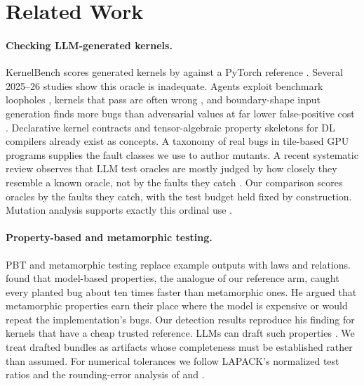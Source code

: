 \section{Related Work}
\label{sec:related}

\paragraph{Checking LLM-generated kernels.}
KernelBench scores generated kernels by \allclose against a PyTorch reference
\citep{ouyang2025kernelbench}. Several 2025--26 studies show this oracle is inadequate.
Agents exploit benchmark loopholes \citep{lange2025robust}, kernels that pass are often
wrong \citep{sarkar2026illusion}, and boundary-shape input generation finds more bugs
than adversarial values at far lower false-positive cost \citep{sarkar2026inputs}.
Declarative kernel contracts \citep{veit2026contracts,shah2026contract} and
tensor-algebraic property skeletons for DL compilers \citep{qiu2026propilot} already
exist as concepts. A taxonomy of \isstaBugs{} real bugs in tile-based GPU programs
\citep{rathnasuriya2026tile} supplies the fault classes we use to author mutants. A
recent systematic review observes that LLM test oracles are mostly judged by how closely
they resemble a known oracle, not by the faults they catch \citep{mughal2026oracles}. Our
comparison scores oracles by the faults they catch, with the test budget held fixed by
construction. Mutation analysis supports exactly this ordinal use
\citep{andrews2005mutation,just2014mutants,papadakis2018mutation}.

\paragraph{Property-based and metamorphic testing.}
PBT \citep{claessen2000quickcheck,maciver2019hypothesis} and metamorphic testing
\citep{chen2018metamorphic,barr2015oracle} replace example outputs with laws and
relations. \citet{hughes2020specify} found that model-based properties, the analogue of our
reference arm, caught every planted bug about ten times faster than metamorphic ones. He
argued that metamorphic properties earn their place where the model is expensive or
would repeat the implementation's bugs. Our detection results reproduce his finding for
kernels that have a cheap trusted reference. LLMs can draft such properties
\citep{vikram2023pbt}. We treat drafted bundles as artifacts whose completeness must be
established rather than assumed. For numerical tolerances we follow LAPACK's normalized
test ratios \citep{anderson1992lawn41} and the rounding-error analysis of
\citet{higham2002accuracy} and \citet{higham2019probabilistic}.

